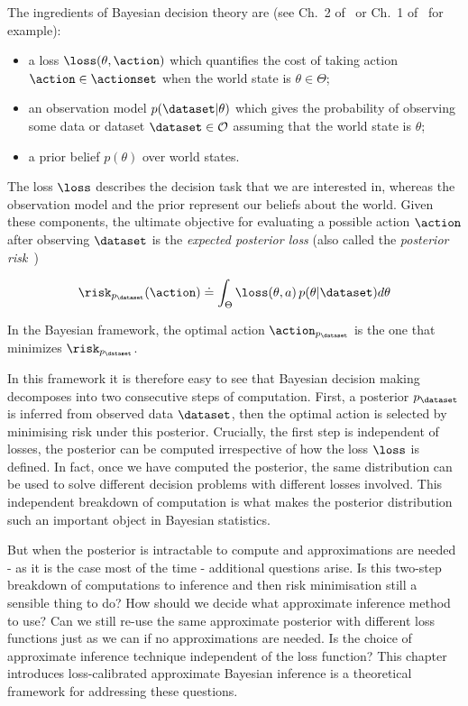 The ingredients of Bayesian decision theory are (see Ch.~2 of~\cite{robert01choice} or Ch.~1 of~\cite{berger85decision} for example):
\vspace{-.3cm}
\begin{itemize}
  \item a loss $\loss(\theta,\action)$ which quantifies the cost of taking action $\action \in \actionset$ when the world state is $\theta \in \Theta$; %
  \item an observation model $p(\dataset|\theta)$ which gives the probability of observing some data or dataset $\dataset \in \mathcal{O}$ assuming that the world state is $\theta$;
  \item a prior belief $p(\theta)$ over world states.
\end{itemize}

The loss $\loss$ describes the decision task that we are interested in, whereas the observation model and the prior represent our beliefs about the world. Given these components, the ultimate objective for evaluating a possible action $\action$ after observing $\dataset$ is the \emph{expected posterior loss} (also called the \emph{posterior risk}~\cite{schervish95theory})

\begin{equation}
	\risk_{p_\dataset}(\action) \doteq \int_\Theta \loss(\theta, a) \, p(\theta|\dataset) d\theta
\end{equation}

In the Bayesian framework, the optimal action $\action_{p_\dataset}$ is the one that minimizes $\risk_{p_\dataset}$.

In this framework it is therefore easy to see that Bayesian decision making decomposes into two consecutive steps of computation. First, a posterior $p_\dataset$ is inferred from observed data $\dataset$, then the optimal action is selected by minimising risk under this posterior. Crucially, the first step is independent of losses, the posterior can be computed irrespective of how the loss $\loss$ is defined. In fact, once we have computed the posterior, the same distribution can be used to solve different decision problems with different losses involved. This independent breakdown of computation is what makes the posterior distribution such an important object in Bayesian statistics.

But when the posterior is intractable to compute and approximations are needed - as it is the case most of the time - additional questions arise. Is this two-step breakdown of computations to inference and then risk minimisation still a sensible thing to do? How should we decide what approximate inference method to use? Can we still re-use the same approximate posterior with different loss functions just as we can if no approximations are needed. Is the choice of approximate inference technique independent of the loss function? This chapter introduces loss-calibrated approximate Bayesian inference is a theoretical framework for addressing these questions.

